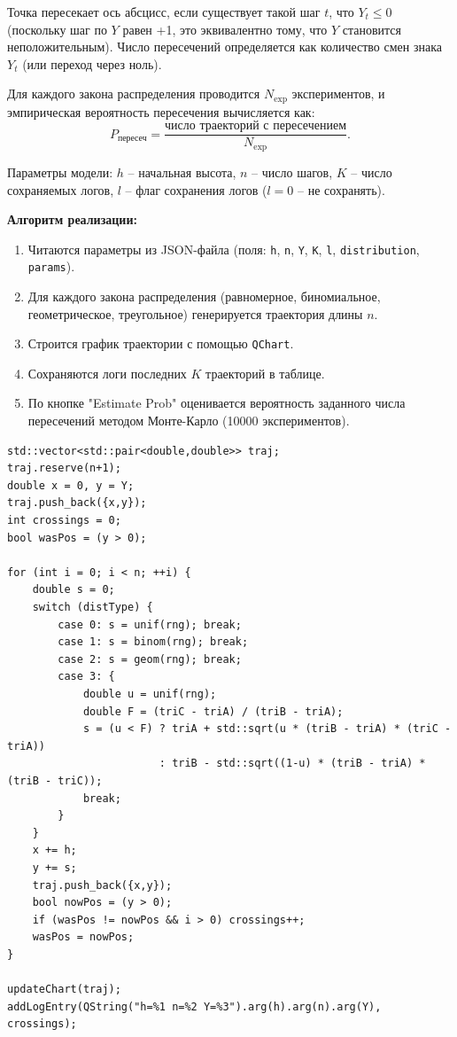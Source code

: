 \documentclass[a4paper]{article}
\theoremstyle{definition}
\begin{document}
Точка пересекает ось абсцисс, если существует такой шаг $t$, что $Y_t \le 0$ (поскольку шаг по $Y$ равен +1, это эквивалентно тому, что $Y$ становится неположительным). Число пересечений определяется как количество смен знака $Y_t$ (или переход через ноль).

Для каждого закона распределения проводится $N_{\text{exp}}$ экспериментов, и эмпирическая вероятность пересечения вычисляется как:
\begin{equation}
    P_{\text{пересеч}} = \frac{\text{число траекторий с пересечением}}{N_{\text{exp}}}. \tag{4.2}
\end{equation}

Параметры модели: $h$ – начальная высота, $n$ – число шагов, $K$ – число сохраняемых логов, $l$ – флаг сохранения логов ($l=0$ – не сохранять).

\textbf{Алгоритм реализации:}

\begin{enumerate}
    \item Читаются параметры из JSON-файла (поля: \texttt{h}, \texttt{n}, \texttt{Y}, \texttt{K}, \texttt{l}, \texttt{distribution}, \texttt{params}).
    \item Для каждого закона распределения (равномерное, биномиальное, геометрическое, треугольное) генерируется траектория длины $n$.
    \item Строится график траектории с помощью \texttt{QChart}.
    \item Сохраняются логи последних $K$ траекторий в таблице.
    \item По кнопке "Estimate Prob" оценивается вероятность заданного числа пересечений методом Монте-Карло (10000 экспериментов).
\end{enumerate}

\begin{lstlisting}[caption={Основной алгоритм генерации траектории и подсчёта пересечений}, label=lst4]
std::vector<std::pair<double,double>> traj;
traj.reserve(n+1);
double x = 0, y = Y;
traj.push_back({x,y});
int crossings = 0;
bool wasPos = (y > 0);

for (int i = 0; i < n; ++i) {
    double s = 0;
    switch (distType) {
        case 0: s = unif(rng); break;
        case 1: s = binom(rng); break;
        case 2: s = geom(rng); break;
        case 3: {
            double u = unif(rng);
            double F = (triC - triA) / (triB - triA);
            s = (u < F) ? triA + std::sqrt(u * (triB - triA) * (triC - triA))
                        : triB - std::sqrt((1-u) * (triB - triA) * (triB - triC));
            break;
        }
    }
    x += h;
    y += s;
    traj.push_back({x,y});
    bool nowPos = (y > 0);
    if (wasPos != nowPos && i > 0) crossings++;
    wasPos = nowPos;
}

updateChart(traj);
addLogEntry(QString("h=%1 n=%2 Y=%3").arg(h).arg(n).arg(Y), crossings);
\end{lstlisting}
\end{document}
